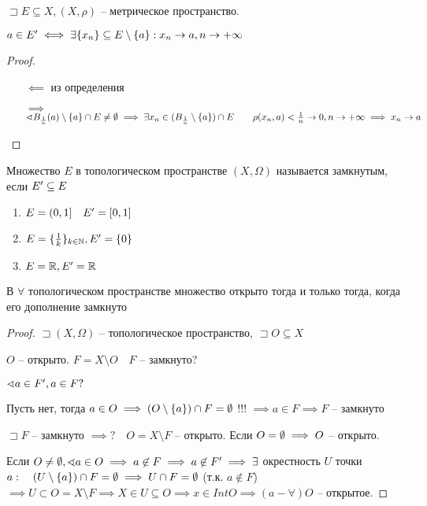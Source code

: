 \begin{statement}
    $\sqsupset E\subseteq X, (X, \rho)$ -- метрическое пространство.

    $a\in E^{\prime} \iff  \exists \{x_{n} \} \subseteq E\setminus \{a\}: x_{n} \to a, n\to +\infty $
\end{statement}
\begin{proof}
    \begin{itemize}
        \item [$\impliedby $] из определения
        \item [$\implies $] $\sphericalangle B_{\frac{1}{n}}(a)\setminus \{a\} \cap E\neq \emptyset  \implies  \exists x_n\in (B_{\frac{1}{n}}\setminus \{a\})\cap E\qquad \rho(x_{n} , a) <\frac{1}{n} \to 0, n\to +\infty  \implies  x_{n} \to a$
    \end{itemize}
\end{proof}

\begin{definition}
    Множество $E$  в топологическом пространстве  $(X, \Omega)$ называется замкнутым, если $E^{\prime} \subseteq E$
\end{definition}
\begin{example}
    \begin{enumerate}
        \item $E = (0,1]\quad E^{\prime} = [0,1]$
        \item  $E = \{\frac{1}{k}\}_{k\in \mathbb{N} }, E^{\prime} = \{0\}$ 
        \item $E = \mathbb{R}, E^{\prime} = \mathbb{R}$
    \end{enumerate}
\end{example}
\begin{theorem}
    В $\forall $ топологическом пространстве множество открыто тогда и только тогда, когда его дополнение замкнуто
\end{theorem}
\begin{proof}
    $\sqsupset (X, \Omega)$ -- топологическое пространство, $\sqsupset O\subseteq X$

    $O$ -- открыто. $F = X\setminus O\quad F$ -- замкнуто?

    $\sphericalangle a\in F^{\prime}, a\in F?$

    Пусть нет, тогда $a\in O \implies (O\setminus \{a\})\cap F = \emptyset $ !!! $\implies  a\in F \implies F$ -- замкнуто 

    $\sqsupset F$ -- замкнуто $\implies ?\quad O = X\setminus F$ -- открыто. Если $O = \emptyset  \implies  O$ -- открыто.

    Если $O\neq \emptyset , \sphericalangle a\in O \implies a \not\in F \implies a\not\in F^{\prime} \implies \exists $ окрестность $U$ точки $a:\quad \left( U\setminus \{a\} \right) \cap F = \emptyset \implies  U\cap F = \emptyset $ (т.к. $a\not\in F$) $\implies  U\subset O = X\setminus F \implies  X\in U\subseteq O \implies x\in Int O \implies (a-\forall )O $ -- открытое.
\end{proof}

